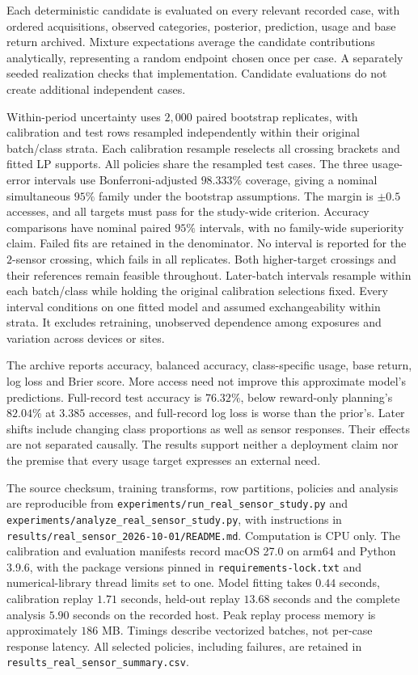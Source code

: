 \documentclass[manuscript, screen, review]{jair}
\begin{document}
Each deterministic candidate is evaluated on every relevant recorded case, with ordered acquisitions, observed categories, posterior, prediction, usage and base return archived. Mixture expectations average the candidate contributions analytically, representing a random endpoint chosen once per case. A separately seeded realization checks that implementation. Candidate evaluations do not create additional independent cases.

Within-period uncertainty uses $2{,}000$ paired bootstrap replicates, with calibration and test rows resampled independently within their original batch/class strata. Each calibration resample reselects all crossing brackets and fitted LP supports. All policies share the resampled test cases. The three usage-error intervals use Bonferroni-adjusted $98.333\%$ coverage, giving a nominal simultaneous $95\%$ family under the bootstrap assumptions. The margin is $\pm0.5$ accesses, and all targets must pass for the study-wide criterion. Accuracy comparisons have nominal paired $95\%$ intervals, with no family-wide superiority claim. Failed fits are retained in the denominator. No interval is reported for the $2$-sensor crossing, which fails in all replicates. Both higher-target crossings and their references remain feasible throughout. Later-batch intervals resample within each batch/class while holding the original calibration selections fixed. Every interval conditions on one fitted model and assumed exchangeability within strata. It excludes retraining, unobserved dependence among exposures and variation across devices or sites.

The archive reports accuracy, balanced accuracy, class-specific usage, base return, log loss and Brier score. More access need not improve this approximate model's predictions. Full-record test accuracy is $76.32\%$, below reward-only planning's $82.04\%$ at $3.385$ accesses, and full-record log loss is worse than the prior's. Later shifts include changing class proportions as well as sensor responses. Their effects are not separated causally. The results support neither a deployment claim nor the premise that every usage target expresses an external need.

The source checksum, training transforms, row partitions, policies and analysis are reproducible from \texttt{experiments/\allowbreak run\_real\_sensor\_study.py} and \texttt{experiments/\allowbreak analyze\_real\_sensor\_study.py}, with instructions in \texttt{results/\allowbreak real\_sensor\_2026-10-01/\allowbreak README.md}. Computation is CPU only. The calibration and evaluation manifests record macOS 27.0 on arm64 and Python 3.9.6, with the package versions pinned in \texttt{requirements-lock.txt} and numerical-library thread limits set to one. Model fitting takes $0.44$ seconds, calibration replay $1.71$ seconds, held-out replay $13.68$ seconds and the complete analysis $5.90$ seconds on the recorded host. Peak replay process memory is approximately $186$ MB. Timings describe vectorized batches, not per-case response latency. All selected policies, including failures, are retained in \texttt{results\_real\_sensor\_summary.csv}.
\end{document}
